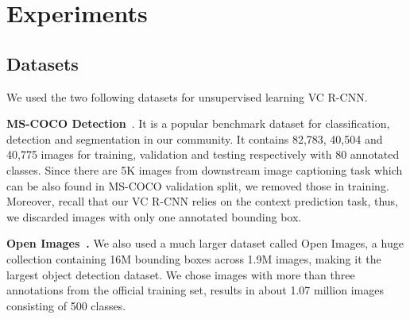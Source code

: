 \documentclass[10pt,twocolumn,letterpaper]{article}
\begin{document}
 \section{Experiments}
\label{sec:exp}







\subsection{Datasets}
We used the two following datasets for unsupervised learning VC R-CNN.

\noindent\textbf{MS-COCO Detection}~\cite{lin2014microsoft}. It is a popular benchmark dataset for classification, detection and segmentation in our community. It contains 82,783, 40,504 and 40,775 images for training, validation and testing respectively with 80 annotated classes.
Since there are 5K images from downstream image captioning task which can be also found in MS-COCO validation split, we removed those in training. Moreover, recall that our VC R-CNN relies on the context prediction task, thus, we discarded images with only one annotated bounding box.


\noindent\textbf{Open Images~\cite{kuznetsova2018open}.}
We also used a much larger dataset called Open Images, a huge collection containing 16M bounding boxes across 1.9M images, making it the largest object detection dataset.
We chose images with more than three annotations from the official training set, results in about 1.07 million images consisting of 500 classes. 
\end{document}
